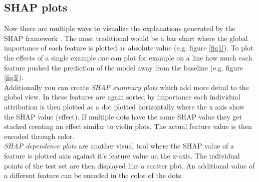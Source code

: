 \documentclass[conference]{IEEEtran}
\begin{document}
\subsection{SHAP plots}
Now there are multiple ways to visualize the explanations generated by the SHAP framework \cite{b1}.
The most traditional would be a bar chart where the global importance of each feature is plotted as absolute value (e.g. figure \ref{fig1}). To plot the effects of a single example one can plot for example on a line how much each feature pushed the prediction of the model away from the baseline (e.g. figure \ref{fig3}).\\
Additionally you can create \textit{SHAP summary plots} which add more detail to the global view. In these features are again sorted by importance each individual attribution is then plotted as a dot plotted horizontally where the x axis show the SHAP value (effect). If multiple dots have the same SHAP value they get stacked creating an effect similar to violin plots. The actual feature value is then encoded through color.\\
\textit{SHAP dependence plots} are another visual tool where the SHAP value of a feature is plotted axis against it's feature value on the x-axis. The individual points of the test set are then displayed like a scatter plot. An additional value of a different feature can be encoded in the color of the dots.
\end{document}
